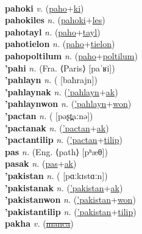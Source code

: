  \label{pahocwemontalon} \\
\textbf{pahoki} \textit{v.} (\hyperref[paho]{paho}+\hyperref[ki]{ki})
 \label{pahoki} \\
\textbf{pahokiles} \textit{n.} (\hyperref[pahoki]{pahoki}+\hyperref[les]{les})
 \label{pahokiles} \\
\textbf{pahotayl} \textit{n.} (\hyperref[paho]{paho}+\hyperref[tayl]{tayl})
 \label{pahotayl} \\
\textbf{pahotielon} \textit{n.} (\hyperref[paho]{paho}+\hyperref[tielon]{tielon})
 \label{pahotielon} \\
\textbf{pahopoltilum} \textit{n.} (\hyperref[paho]{paho}+\hyperref[poltilum]{poltilum})
 \label{pahopoltilum} \\
\textbf{'pahi} \textit{n.} (Fra. ⟨Paris⟩ [paˈʁi])
 \label{'pahi} \\
\textbf{'pahlayn} \textit{n.} ( [baħrajn])
 \label{'pahlayn} \\
\textbf{'pahlaynak} \textit{n.} (\hyperref['pahlayn]{'pahlayn}+\hyperref[ak]{ak})
 \label{'pahlaynak} \\
\textbf{'pahlaynwon} \textit{n.} (\hyperref['pahlayn]{'pahlayn}+\hyperref[won]{won})
 \label{'pahlaynwon} \\
\textbf{'pactan} \textit{n.} ( [pəʂt̪aːnə])
 \label{'pactan} \\
\textbf{'pactanak} \textit{n.} (\hyperref['pactan]{'pactan}+\hyperref[ak]{ak})
 \label{'pactanak} \\
\textbf{'pactantilip} \textit{n.} (\hyperref['pactan]{'pactan}+\hyperref[tilip]{tilip})
 \label{'pactantilip} \\
\textbf{pas} \textit{n.} (Eng. ⟨path⟩ [pʰæθ])
 \label{pas} \\
\textbf{pasak} \textit{n.} (\hyperref[pas]{pas}+\hyperref[ak]{ak})
 \label{pasak} \\
\textbf{'pakistan} \textit{n.} ( [pɑːkɪstɑːn])
 \label{'pakistan} \\
\textbf{'pakistanak} \textit{n.} (\hyperref['pakistan]{'pakistan}+\hyperref[ak]{ak})
 \label{'pakistanak} \\
\textbf{'pakistanwon} \textit{n.} (\hyperref['pakistan]{'pakistan}+\hyperref[won]{won})
 \label{'pakistanwon} \\
\textbf{'pakistantilip} \textit{n.} (\hyperref['pakistan]{'pakistan}+\hyperref[tilip]{tilip})
 \label{'pakistantilip} \\
\textbf{pakha} \textit{v.} (\hyperref[manca]{\sout{manca}})
 \label{pakha} \\
